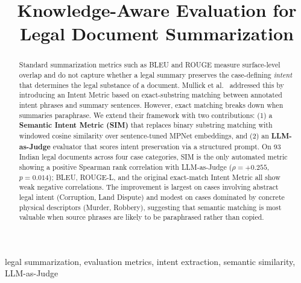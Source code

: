 \documentclass[conference,a4paper]{IEEEtran}
\begin{document}
\title{Knowledge-Aware Evaluation for\\Legal Document Summarization}

\author{
\and
{}
\and
{}
}

\maketitle

\begin{abstract}
Standard summarization metrics such as BLEU and ROUGE measure surface-level overlap and do not capture whether a legal summary preserves the case-defining \textit{intent} that determines the legal substance of a document. Mullick et al.~\cite{mullick2022} addressed this by introducing an Intent Metric based on exact-substring matching between annotated intent phrases and summary sentences. However, exact matching breaks down when summaries paraphrase. We extend their framework with two contributions: (1) a \textbf{Semantic Intent Metric (SIM)} that replaces binary substring matching with windowed cosine similarity over sentence-tuned MPNet embeddings, and (2) an \textbf{LLM-as-Judge} evaluator that scores intent preservation via a structured prompt. On 93 Indian legal documents across four case categories, SIM is the only automated metric showing a positive Spearman rank correlation with LLM-as-Judge ($\rho{=}{+}0.255$, $p{=}0.014$); BLEU, ROUGE-L, and the original exact-match Intent Metric all show weak negative correlations. The improvement is largest on cases involving abstract legal intent (Corruption, Land Dispute) and modest on cases dominated by concrete physical descriptors (Murder, Robbery), suggesting that semantic matching is most valuable when source phrases are likely to be paraphrased rather than copied.
\end{abstract}

\begin{IEEEkeywords}
legal summarization, evaluation metrics, intent extraction, semantic similarity, LLM-as-Judge
\end{IEEEkeywords}
\end{document}
